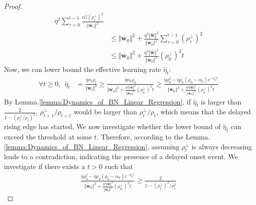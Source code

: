 \documentclass[pdflatex,sn-basic]{sn-jnl}%
\theoremstyle{thmstyleone}%
\begin{document}
\begin{appendices}
\begin{proof}
\begin{equation*}
\begin{aligned}
    \eta^{2} \sum_{\tau=0}^{t-1} \frac{\alpha_\tau^2 \left(\rho_{\tau}^{\perp}\right)^2}{\Vert \mathbf{w}_\tau \Vert^2}
    \\ & \le 
    \Vert \mathbf{w}_0 \Vert^{2} + 
    \frac{\eta^{2} \Vert \hat{\mathbf{w}} \Vert^2 }{\Vert \mathbf{w}_0 \Vert^2} \sum_{\tau=0}^{t-1} \left(\rho_{\tau}^{\perp}\right)^2
    \\ & \le 
    \Vert \mathbf{w}_0 \Vert^{2} + 
    \frac{\eta^{2} \Vert \hat{\mathbf{w}} \Vert^2 }{\Vert \mathbf{w}_0 \Vert^2} \left(\rho_{0}^{\perp}\right)^2 t
  \end{aligned}
  \end{equation*}
  Now, we can lower bound the effective learning rate $\hat{\eta}_t$: 
  \begin{equation*}
  \begin{aligned}
    \forall t \ge 0, \ \ \hat{\eta}_t & = \frac{\eta \alpha_t \rho_t}{\Vert \mathbf{w}_t \Vert^2}
    \ge 
    \frac{\eta \alpha_t \rho_0}{\Vert \mathbf{w}_0 \Vert^{2} + 
    \frac{\eta^{2} \Vert \hat{\mathbf{w}} \Vert^2 }{\Vert \mathbf{w}_0 \Vert^2} \left(\rho_{0}^{\perp}\right)^2 t}
    \ge 
    \frac{\eta \rho_0^2 - \eta \rho_0 \left(\rho_0 -\alpha_{0}\right) e^{-\eta_{\alpha}t}}
    {\Vert \mathbf{w}_0 \Vert^{2} + 
    \frac{\eta^{2} \Vert \hat{\mathbf{w}} \Vert^2 }{\Vert \mathbf{w}_0 \Vert^2} \left(\rho_{0}^{\perp}\right)^2 t}
  \end{aligned}
  \end{equation*}
  By Lemma.\ref{lemma:Dynamics_of_BN_Linear_Regression}, if $\hat{\eta}_t$ is larger than $\frac{2}{1 - (\rho_t^{\perp}/\rho_t)^2}$, 
  $\rho_{t+1}^{\perp} / \rho_{t+1}$ would be larger than $\rho_{t}^{\perp} / \rho_t$, which means that the delayed rising edge has started. 
  We now investigate whether the lower bound of $\hat{\eta}_t$ can exceed the threshold at some $t$. 
  Therefore, according to the Lemma.\ref{lemma:Dynamics_of_BN_Linear_Regression}, assuming $\rho_t^{\perp}$ is always decreasing leads to a contradiction, 
  indicating the presence of a delayed onset event. 
  We investigate if there exists a $t > 0$ such that 
  \begin{equation}\label{eq:linear_spike_trigger_threshold}
  \begin{aligned}
    \frac{\eta \rho_0^2 - \eta \rho_0 \left(\rho_0 -\alpha_{0}\right) e^{-\eta_{\alpha}t}}
    {\Vert \mathbf{w}_0 \Vert^{2} + 
    \frac{\eta^{2} \Vert \hat{\mathbf{w}} \Vert^2 }{\Vert \mathbf{w}_0 \Vert^2} \left(\rho_{0}^{\perp}\right)^2 t}
    \ge
    \frac{2}{1 - (\rho_t^{\perp})^2/\rho_t^2} 

\end{aligned}
\end{equation}
\end{proof}
\end{appendices}
\end{document}
